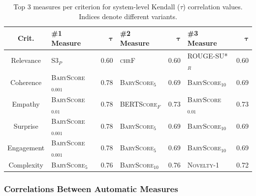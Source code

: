 \begin{table}[h]
\centering
\begin{tabular}{c|lr|lr|lr}
\toprule
\textbf{Crit.} & \textbf{\#1 Measure} & $\boldsymbol{\tau}$ & \textbf{\#2 Measure} & $\boldsymbol{\tau}$ & \textbf{\#3 Measure} & $\boldsymbol{\tau}$ \\
\midrule
Relevance & \textsc{S3}$_P$ & 0.60 & \textsc{chrF} & 0.60 & \textsc{ROUGE-SU*}$_R$ & 0.60 \\
Coherence & \textsc{BaryScore}$_{0.001}$ & 0.78 & \textsc{BaryScore}$_5$ & 0.69 & \textsc{BaryScore}$_{10}$ & 0.69 \\
Empathy & \textsc{BaryScore}$_{0.01}$ & 0.78 & \textsc{BERTScore}$_F$ & 0.73 & \textsc{BaryScore}$_{0.01}$ & 0.73 \\
Surprise & \textsc{BaryScore}$_{0.001}$ & 0.78 & \textsc{BaryScore}$_5$ & 0.69 & \textsc{BaryScore}$_{10}$ & 0.69 \\
Engagement & \textsc{BaryScore}$_{0.001}$ & 0.78 & \textsc{BaryScore}$_5$ & 0.69 & \textsc{BaryScore}$_{10}$ & 0.69 \\
Complexity & \textsc{BaryScore}$_5$ & 0.76 & \textsc{BaryScore}$_{10}$ & 0.76 & \textsc{Novelty}-1 & 0.72 \\
\bottomrule
\end{tabular}
\caption{Top 3 measures per criterion for system-level Kendall ($\tau$) correlation values. Indices denote different variants.}
\label{tab:top3_measures_system}
\end{table}

\subsubsection{Correlations Between Automatic Measures}

